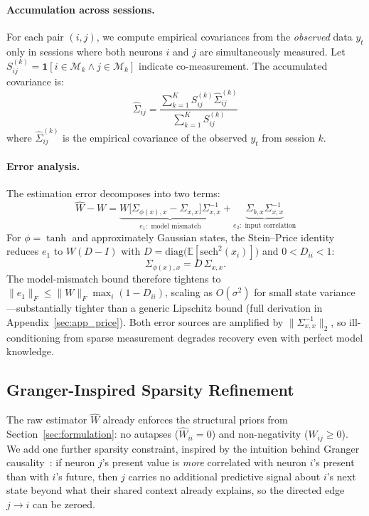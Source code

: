 \documentclass{article}
\begin{document}
\paragraph{Accumulation across sessions.}
For each pair $(i,j)$, we compute empirical covariances from the \emph{observed} data $y_t$ only in sessions where both neurons $i$ and $j$ are simultaneously measured.
Let $S_{ij}^{(k)} = \mathbf{1}[i \in \mathcal{M}_k \wedge j \in \mathcal{M}_k]$ indicate co-measurement.
The accumulated covariance is:
\begin{equation}
    \hat{\Sigma}_{ij} = \frac{\sum_{k=1}^{K} S_{ij}^{(k)} \hat{\Sigma}_{ij}^{(k)}}{\sum_{k=1}^{K} S_{ij}^{(k)}}
\end{equation}
where $\hat{\Sigma}_{ij}^{(k)}$ is the empirical covariance of the observed $y_t$ from session $k$.

\paragraph{Error analysis.}
The estimation error decomposes into two terms:
\begin{equation}
    \hat{W} - W = \underbrace{W\bigl[\Sigma_{\phi(x),x} - \Sigma_{x,x}\bigr]\Sigma_{x,x}^{-1}}_{e_1:\text{ model mismatch}} + \underbrace{\Sigma_{b,x}\Sigma_{x,x}^{-1}}_{e_2:\text{ input correlation}}
    \label{eq:error}
\end{equation}
For $\phi = \tanh$ and approximately Gaussian states, the Stein--Price identity \citep{price1958useful, stein1981estimation} reduces $e_1$ to $W(D - I)$ with $D = \mathrm{diag}\!\big(\mathbb{E}[\mathrm{sech}^2(x_i)]\big)$ and $0 < D_{ii} < 1$:
\begin{equation}
    \Sigma_{\phi(x),x} = D \, \Sigma_{x,x}.
    \label{eq:price}
\end{equation}
The model-mismatch bound therefore tightens to $\|e_1\|_F \leq \|W\|_F \max_i(1 - D_{ii})$, scaling as $O(\sigma^2)$ for small state variance---substantially tighter than a generic Lipschitz bound (full derivation in Appendix~\ref{sec:app_price}). Both error sources are amplified by $\|\Sigma_{x,x}^{-1}\|_2$, so ill-conditioning from sparse measurement degrades recovery even with perfect model knowledge.

\subsection{Granger-Inspired Sparsity Refinement}
\label{sec:granger}

The raw estimator $\hat{W}$ already enforces the structural priors from Section~\ref{sec:formulation}: no autapses ($\hat{W}_{ii} = 0$) and non-negativity ($W_{ij} \geq 0$).
We add one further sparsity constraint, inspired by the intuition behind Granger causality~\citep{granger1969investigating}: if neuron $j$'s present value is \emph{more} correlated with neuron $i$'s present than with $i$'s future, then $j$ carries no additional predictive signal about $i$'s next state beyond what their shared context already explains, so the directed edge $j \to i$ can be zeroed.
\end{document}

